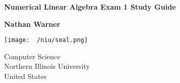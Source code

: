 \documentclass{report}
\title{\Huge{}}
\author{\huge{Nathan Warner}}
\date{\huge{}}
\begin{document}
        \begin{titlepage}
       \begin{center}
           \vspace*{1cm}
    
           \textbf{Numerical Linear Algebra Exam 1 Study Guide}
    
           \vspace{0.5cm}
            
                
           \vspace{1.5cm}
    
           \textbf{Nathan Warner}
    
           \vfill
                
                
           \vspace{0.8cm}
         
           \texttt{[image: ~/niu/seal.png]}
                
           Computer Science \\
           Northern Illinois University\\
           United States\\
           
                
       \end{center}
    \end{titlepage}
    \tableofcontents
    \pagebreak 
\end{document}
